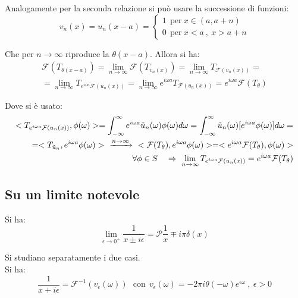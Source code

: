\documentclass[twoside]{article}
\begin{document}
Analogamente per la seconda relazione si può usare la successione di funzioni:
\begin{equation}
    v_n(x)=u_n(x-a)=\left\{ \begin{array}{lr}
         1 \ \ \text{per} \ x \in (a,a+n)  \\
         0 \ \ \text{per} \ x<a \ , \ x>a+n
    \end{array}\right.
\end{equation}

Che per $n\to \infty$ riproduce la $\theta(x-a)$. Allora si ha:
\begin{equation}
    \begin{split}
        \mathcal{F}(T_{\theta(x-a)})=\lim_{n\to \infty} \mathcal{F}(T_{v_{n}(x)})=\lim_{n\to \infty}T_{\mathcal{F}(v_n(x))}= \\
        = \lim_{n\to \infty}T_{e^{i\omega a}\mathcal{F}(u_n(x))}=\lim_{n\to \infty} e^{i\omega a} T_{\mathcal{F}(u_n(x))}=e^{i\omega a} \mathcal{F}(T_{\theta})
    \end{split}
\end{equation}

Dove si è usato:
\begin{equation}\begin{split}
    <T_{e^{i\omega a}\mathcal{F}(u_n(x))},\phi(\omega)>=\int_{-\infty}^{\infty}e^{i\omega a}\Tilde{u}_n(\omega) \phi(\omega) d\omega= \int_{-\infty}^{\infty}\Tilde{u}_n(\omega)[e^{i\omega a}\phi(\omega)]d\omega =\\
    =<T_{\Tilde{u}_n},e^{i\omega a}\phi(\omega)> \ \ \xrightarrow{n \to \infty} \ \ <\mathcal{F}(T_{\theta}),e^{i\omega a}\phi(\omega)>=<e^{i\omega a}\mathcal{F}(T_{\theta}),\phi(\omega)> \\
    \forall \phi \in S \ \ \ \Rightarrow \ \lim_{n\to \infty}T_{e^{i\omega a}\mathcal{F}(u_n(x))}=e^{i\omega a}\mathcal{F}(T_{\theta})
\end{split}\end{equation}

\subsection{Su un limite notevole}
Si ha:
\begin{equation}
    \lim_{\epsilon\to 0^+}\frac{1}{x\pm i\epsilon}=\mathcal{P}\frac{1}{x}\mp i\pi \delta(x)
\end{equation}

Si studiano separatamente i due casi.
\\
Si ha:
\begin{equation}
    \frac{1}{x+i\epsilon}=\mathcal{F}^{-1}(v_{\epsilon}(\omega)) \ \ \ \text{con} \ \ v_{\epsilon}(\omega)=-2\pi i \theta(-\omega)e^{\epsilon \omega} \ , \ \epsilon >0
\end{equation}
\end{document}
